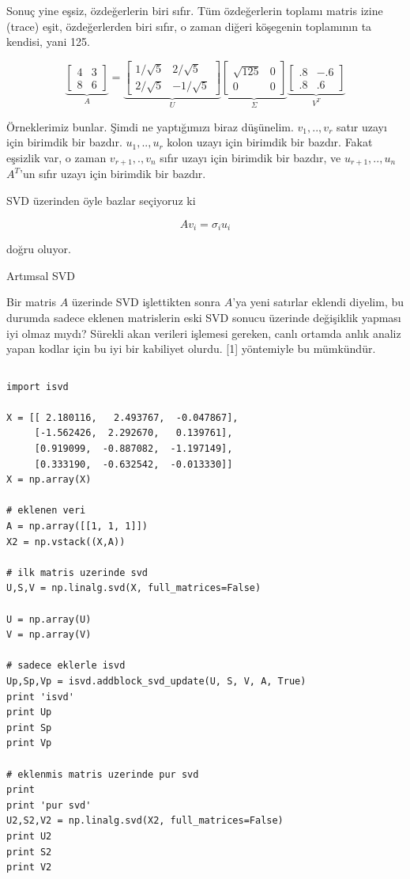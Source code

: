 \documentclass[12pt,fleqn]{article}\usepackage{../../common}
\begin{document}
Sonuç yine eşsiz, özdeğerlerin biri sıfır. Tüm özdeğerlerin toplamı matris izine
(trace) eşit, özdeğerlerden biri sıfır, o zaman diğeri köşegenin toplamının
ta kendisi, yani 125. 

$$ 
\underbrace{
\left[\begin{array}{rr}
4 & 3 \\ 8 & 6
\end{array}\right] 
}_{A}
=
\underbrace{
\left[\begin{array}{rr}
1/\sqrt{ 5} & 2/\sqrt{5} \\ 2/\sqrt{ 5} & -1/\sqrt{5}
\end{array}\right]
}_{U}
\underbrace{
\left[\begin{array}{rr}
\sqrt{ 125} & 0 \\ 0 & 0
\end{array}\right]
}_{\Sigma}
\underbrace{
\left[\begin{array}{rr}
.8 & -.6 \\
.8 & .6 
\end{array}\right]
}_{V^T}
 $$

Örneklerimiz bunlar. Şimdi ne yaptığımızı biraz düşünelim. $v_1,..,v_r$
satır uzayı için birimdik bir bazdır. $u_1,..,u_r$ kolon uzayı için
birimdik bir bazdır. Fakat eşsizlik var, o zaman $v_{r+1},.,v_n$ sıfır
uzayı için birimdik bir bazdır, ve $u_{r+1},..,u_n$ $A^T$'un sıfır
uzayı için birimdik bir bazdır. 

SVD üzerinden öyle bazlar seçiyoruz ki 

$$ Av_i = \sigma_i u_i $$ 

doğru oluyor. 

Artımsal SVD

Bir matris $A$ üzerinde SVD işlettikten sonra $A$'ya yeni satırlar eklendi
diyelim, bu durumda sadece eklenen matrislerin eski SVD sonucu üzerinde
değişiklik yapması iyi olmaz mıydı? Sürekli akan verileri işlemesi gereken,
canlı ortamda anlık analiz yapan kodlar için bu iyi bir kabiliyet olurdu.
[1] yöntemiyle bu mümkündür. 

\inputminted[fontsize=\footnotesize]{python}{isvd.py}

\begin{verbatim}
import isvd

X = [[ 2.180116,   2.493767,  -0.047867],
     [-1.562426,  2.292670,   0.139761],
     [0.919099,  -0.887082,  -1.197149],
     [0.333190,  -0.632542,  -0.013330]]
X = np.array(X)

# eklenen veri
A = np.array([[1, 1, 1]])
X2 = np.vstack((X,A))

# ilk matris uzerinde svd
U,S,V = np.linalg.svd(X, full_matrices=False)

U = np.array(U)
V = np.array(V)

# sadece eklerle isvd
Up,Sp,Vp = isvd.addblock_svd_update(U, S, V, A, True)
print 'isvd'
print Up
print Sp
print Vp

# eklenmis matris uzerinde pur svd
print
print 'pur svd'
U2,S2,V2 = np.linalg.svd(X2, full_matrices=False)
print U2
print S2
print V2
\end{verbatim}
\end{document}
